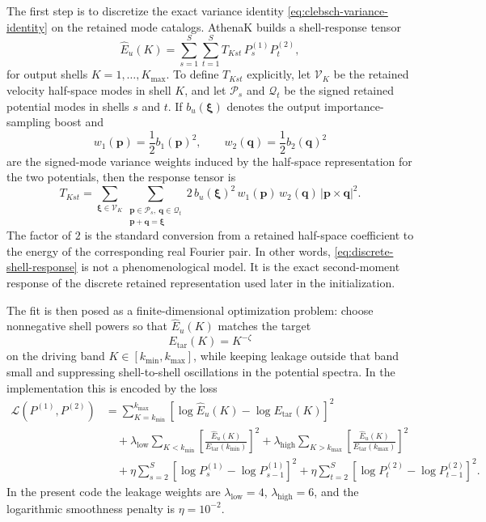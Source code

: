 \documentclass[11pt]{article}
\newcommand{\pp}{\mathbf{p}}
\newcommand{\qq}{\mathbf{q}}
\newcommand{\xii}{\boldsymbol{\xi}}
\begin{document}
The first step is to discretize the exact variance identity \eqref{eq:clebsch-variance-identity} on the retained mode catalogs. AthenaK builds a shell-response tensor
\begin{equation}
\widehat{E}_u(K)
=
\sum_{s=1}^{S}\sum_{t=1}^{S}
T_{Kst}\,P_s^{(1)}P_t^{(2)},
\label{eq:discrete-shell-response}
\end{equation}
for output shells $K=1,\dots,K_{\max}$. To define $T_{Kst}$ explicitly, let $\mathcal{V}_K$ be the retained velocity half-space modes in shell $K$, and let $\mathcal{P}_s$ and $\mathcal{Q}_t$ be the signed retained potential modes in shells $s$ and $t$. If $b_u(\xii)$ denotes the output importance-sampling boost and
\begin{equation}
w_1(\pp)=\frac{1}{2}b_1(\pp)^2,
\qquad
w_2(\qq)=\frac{1}{2}b_2(\qq)^2
\end{equation}
are the signed-mode variance weights induced by the half-space representation for the two potentials, then the response tensor is
\begin{equation}
T_{Kst}
=
\sum_{\xii\in\mathcal{V}_K}
\sum_{\substack{\pp\in\mathcal{P}_s,\ \qq\in\mathcal{Q}_t\\ \pp+\qq=\xii}}
2\,b_u(\xii)^2\,w_1(\pp)\,w_2(\qq)\,|\pp\times\qq|^2.
\label{eq:TKst-definition}
\end{equation}
The factor of $2$ is the standard conversion from a retained half-space coefficient to the energy of the corresponding real Fourier pair. In other words, \eqref{eq:discrete-shell-response} is not a phenomenological model. It is the exact second-moment response of the discrete retained representation used later in the initialization.

The fit is then posed as a finite-dimensional optimization problem: choose nonnegative shell powers so that $\widehat{E}_u(K)$ matches the target
\begin{equation}
E_{\mathrm{tar}}(K) = K^{-\zeta}
\end{equation}
on the driving band $K\in[k_{\min},k_{\max}]$, while keeping leakage outside that band small and suppressing shell-to-shell oscillations in the potential spectra. In the implementation this is encoded by the loss
\begin{align}
\mathcal{L}(P^{(1)},P^{(2)}) &=
\sum_{K=k_{\min}}^{k_{\max}}
\left[\log \widehat{E}_u(K)-\log E_{\mathrm{tar}}(K)\right]^2
\nonumber\\
&\quad
+ \lambda_{\mathrm{low}}
\sum_{K<k_{\min}}
\left[\frac{\widehat{E}_u(K)}{E_{\mathrm{tar}}(k_{\min})}\right]^2
+ \lambda_{\mathrm{high}}
\sum_{K>k_{\max}}
\left[\frac{\widehat{E}_u(K)}{E_{\mathrm{tar}}(k_{\max})}\right]^2
\nonumber\\
&\quad
+ \eta\sum_{s=2}^{S}
\left[\log P_s^{(1)}-\log P_{s-1}^{(1)}\right]^2
+ \eta\sum_{t=2}^{S}
\left[\log P_t^{(2)}-\log P_{t-1}^{(2)}\right]^2.
\label{eq:clebsch-loss}
\end{align}
In the present code the leakage weights are $\lambda_{\mathrm{low}}=4$, $\lambda_{\mathrm{high}}=6$, and the logarithmic smoothness penalty is $\eta=10^{-2}$.
\end{document}
